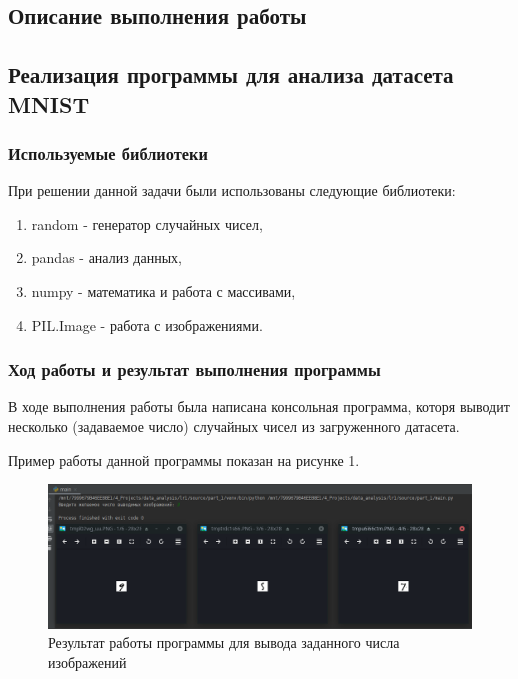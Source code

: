 \documentclass[a4paper]{article}
\begin{document}

\newpage
\begin{center}
\hfill \break
\section{Описание выполнения работы}
\end{center}

\subsection{Реализация программы для анализа датасета MNIST}
\subsubsection{Используемые библиотеки}
\normalsize{
    При решении данной задачи были использованы следующие библиотеки:
    \begin{enumerate}
        \item random - генератор случайных чисел,
        \item pandas - анализ данных,
        \item numpy - математика и работа с массивами,
        \item PIL.Image - работа с изображениями.
    \end{enumerate}
}
\subsubsection{Ход работы и результат выполнения программы}
\normalsize{
    В ходе выполнения работы была написана консольная программа, которя выводит несколько (задаваемое число) случайных чисел из загруженного датасета.
    
    Пример работы данной программы показан на рисунке 1.
    \begin{figure}[h]
        \centering
        \graphicspath{{./}}
        \includegraphics[scale=0.5]{run_program_1}
        \caption{Результат работы программы для вывода заданного числа изображений}
    \end{figure}
}
\end{document}
